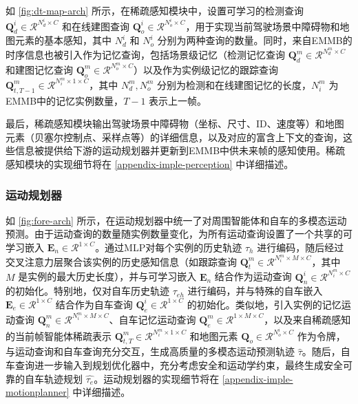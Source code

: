 如 \cref{fig:dt-map-arch} 所示，在稀疏感知模块中，设置可学习的检测查询 $\mathbf{Q}^i_d\in \mathcal{R}^{N^i_d \times C}$ 和在线建图查询 $\mathbf{Q}^i_o\in \mathcal{R}^{N^i_o \times C}$，用于实现当前驾驶场景中障碍物和地图元素的基本感知，其中 $N^i_d$ 和 $N^i_o$ 分别为两种查询的数量。同时，来自EMMB的时序信息也被引入作为记忆查询，包括场景级记忆（检测记忆查询 $\mathbf{Q}^m_d\in \mathcal{R}^{N^m_d \times C}$ 和建图记忆查询 $\mathbf{Q}^m_o\in \mathcal{R}^{N^m_o \times C}$）以及作为实例级记忆的跟踪查询 $\mathbf{Q}^m_{t,T-1}\in \mathcal{R}^{N^m_i \times1\times C}$，其中 $N^m_d,N^m_o$ 分别为检测和在线建图记忆的长度，$N^m_i$ 为EMMB中的记忆实例数量，$T-1$ 表示上一帧。

最后，稀疏感知模块输出驾驶场景中障碍物（坐标、尺寸、ID、速度等）和地图元素（贝塞尔控制点、采样点等）的详细信息，以及对应的富含上下文的查询，这些信息被提供给下游的运动规划器并更新到EMMB中供未来帧的感知使用。稀疏感知模块的实现细节将在 \cref{appendix-imple-perception} 中详细描述。

\subsubsection{运动规划器}
\label{appendix-imple-def-motionplanner}

如 \cref{fig:fore-arch} 所示，在运动规划器中统一了对周围智能体和自车的多模态运动预测。由于运动查询的数量随实例数量变化，为所有运动查询设置了一个共享的可学习嵌入 $\mathbf{E}_n \in \mathcal{R}^{1\times C}$。通过MLP对每个实例的历史轨迹 $\tau_h$ 进行编码，随后经过交叉注意力层聚合该实例的历史感知信息（如跟踪查询 $\mathbf{Q}^m_{t}\in \mathcal{R}^{N^m_i \times M\times C}$，其中 $M$ 是实例的最大历史长度），并与可学习嵌入 $\mathbf{E}_n$ 结合作为运动查询 $\mathbf{Q}^i_n \in \mathcal{R}^{N^m_i \times C}$ 的初始化。特别地，仅对自车历史轨迹 $\tau_{eh}$ 进行编码，并与特殊的自车嵌入 $\mathbf{E}_e \in \mathcal{R}^{1\times C}$ 结合作为自车查询 $\mathbf{Q}^i_e \in \mathcal{R}^{1 \times C}$ 的初始化。类似地，引入实例的记忆运动查询 $\mathbf{Q}^m_n \in \mathcal{R}^{N^m_i \times M\times C}$、自车记忆运动查询 $\mathbf{Q}^m_e \in \mathcal{R}^{1 \times M\times C}$，以及来自稀疏感知的当前帧智能体稀疏表示 $\mathbf{Q}^m_{t,T}\in \mathcal{R}^{N^m_i \times1\times C}$ 和地图元素 $\mathbf{Q}_{o}\in \mathcal{R}^{N^i_o \times C}$ 作为令牌，与运动查询和自车查询充分交互，生成高质量的多模态运动预测轨迹 $\hat{\tau}$。随后，自车查询进一步输入到规划优化器中，充分考虑安全和运动学约束，最终生成安全可靠的自车轨迹规划 $\hat{\tau_e}$。运动规划器的实现细节将在 \cref{appendix-imple-motionplanner} 中详细描述。


